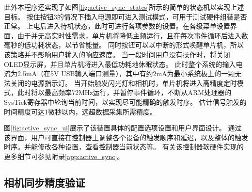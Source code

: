 此外本程序还实现了如图\ref{fig:active_sync_states}所示的简单的状态机以实现上述目标。
按住按钮3的情况下插入电源即可进入测试模式，可用于测试硬件组装是否正常。
上电后进入待机状态，此时可进行各项参数的设置。在各级菜单设置界面，由于并无高实时性需求，单片机将降低主频运行，且在每次事件循环后进入数毫秒的低功耗状态，以节省能量。
同时按钮可以以中断的形式唤醒单片机，所以该策略并不影响用户输入的响应速度。
当一段时间用户没有操作时，将关闭OLED显示屏，并且单片机将进入最低功耗地休眠状态。
此时整个系统的输入电流为2.5mA（在5V USB输入端口测量），其中有约2mA为最小系统板上的一颗无法关闭的电源指示灯。
当开始触发闪光灯和相机时，单片机将进入高精度定时模式，此时将以最高频率72MHz运行，并暂停事件循环，不断从ARM处理器的SysTick寄存器中轮询当前时间，以实现尽可能精确的触发时序。
估计信号触发的时间精度可达1微秒以内，远超数据采集所需精度。

图\ref{fig:active_sync_ui}展示了该装置具体的配置选项设置和用户界面设计。
通过该界面，用户可直接在控制器上调整各个设备的触发顺序和延迟，以及整体的触发时序。并能修改各种设置，查看控制器当前状态等。
有关该控制器软硬件实现的更多细节可参见附录\ref{app:active_sync}。

\subsection{相机同步精度验证}

